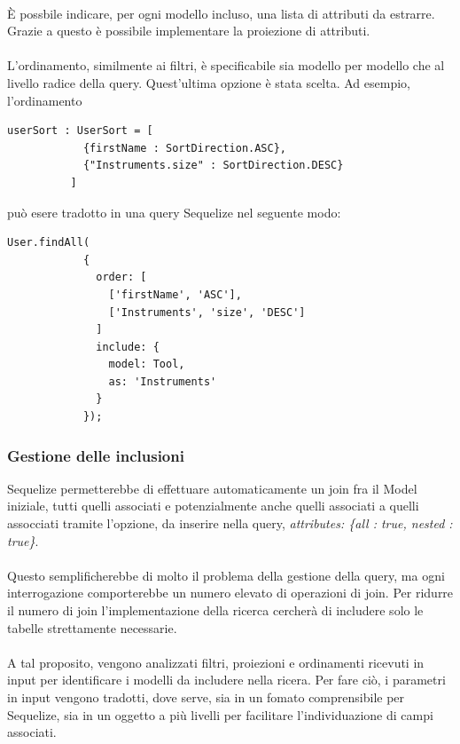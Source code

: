\documentclass[a4paper, 12pt]{report}
\begin{document}
        \paragraph*{}
        È possbile indicare, per ogni modello incluso, una lista di attributi da estrarre. Grazie a questo è possibile implementare la proiezione di attributi.
        \paragraph*{}
        L'ordinamento, similmente ai filtri, è specificabile sia modello per modello che al livello radice della query. Quest'ultima opzione è stata scelta.
        Ad esempio, l'ordinamento
        \begin{Verbatim}[samepage=true]
          userSort : UserSort = [
            {firstName : SortDirection.ASC},
            {"Instruments.size" : SortDirection.DESC}
          ]
        \end{Verbatim}
        può esere tradotto in una query Sequelize nel seguente modo:
        \begin{Verbatim}[samepage=true]
          User.findAll(
            {
              order: [
                ['firstName', 'ASC'],
                ['Instruments', 'size', 'DESC']
              ]
              include: {
                model: Tool,
                as: 'Instruments'
              }
            });
        \end{Verbatim}
      \subsubsection*{Gestione delle inclusioni}
        Sequelize permetterebbe di effettuare automaticamente un join fra il Model iniziale, tutti quelli associati e potenzialmente anche quelli associati a quelli assocciati tramite l'opzione, da inserire nella query,
        \emph{attributes: \{all : true, nested : true\}}.
        \paragraph*{}
        Questo semplificherebbe di molto il problema della gestione della query, ma ogni interrogazione comporterebbe un numero elevato di operazioni di join.
        Per ridurre il numero di join l'implementazione della ricerca cercherà di includere solo le tabelle strettamente necessarie.
        \paragraph*{}
        A tal proposito, vengono analizzati filtri, proiezioni e ordinamenti ricevuti in input per identificare i modelli da includere nella ricera.
        Per fare ciò, i parametri in input vengono tradotti, dove serve, sia in un fomato comprensibile per Sequelize, sia in un oggetto a più livelli per facilitare l'individuazione di campi associati.
\end{document}
